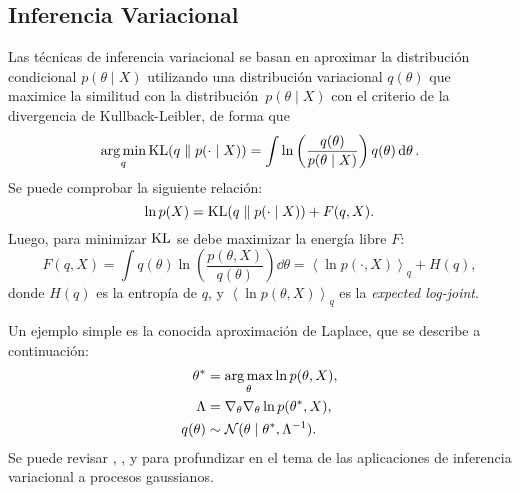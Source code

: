 
\subsection{Inferencia Variacional}


Las técnicas de inferencia variacional se basan en aproximar la distribución condicional \(p(\theta \mid X)\) utilizando una distribución variacional \(q(\theta)\) que maximice la similitud con la distribución\ \(p(\theta \mid X)\) con el criterio de la divergencia de Kullback-Leibler, de forma que
\begin{equation*}
\operatorname*{\arg\min}_{q} \operatorname{KL} (q \parallel p(\cdot \mid X)) = \int  \ln \left(\frac{q(\theta)}{p(\theta \mid X)}\right) q(\theta)\dd{\theta}.
\end{equation*}
Se puede comprobar la siguiente relación:
\begin{equation*}
\ln p(X) = \operatorname{KL} (q \parallel p(\cdot \mid X)) + F(q, X).
\end{equation*}
Luego, para minimizar \(\operatorname{KL}\) se debe maximizar la energía libre \(F\):
\begin{equation*}
F(q, X) = \int q(\theta) \ln \left(\frac{p(\theta, X)}{q(\theta)}\right) \dd{\theta} = \left\langle \ln p(\cdot, X) \right\rangle_{q} + H(q),
\end{equation*}
donde \(H(q)\) es la entropía de \(q\), y \(\left\langle \ln p(\theta,X) \right\rangle_q\) es la \emph{expected log-joint}. 

Un ejemplo simple es la conocida aproximación de Laplace, que se describe a continuación:
\begin{align*}
\theta^{\ast}	&= \operatorname*{\arg\max}_{\theta} \ln p(\theta,X),\\
\Lambda			&= \nabla_\theta \nabla_\theta \ln p(\theta^{\ast},X),\\
q(\theta)		&\sim \mathcal{N}(\theta \mid \theta^{\ast}, \Lambda^{-1}).
\end{align*}
Se puede revisar \cite{titsias2009variational}, \cite{gal2014variational}, y \cite{matthews2016sparse} para profundizar en el tema de las aplicaciones de inferencia variacional a procesos gaussianos.
